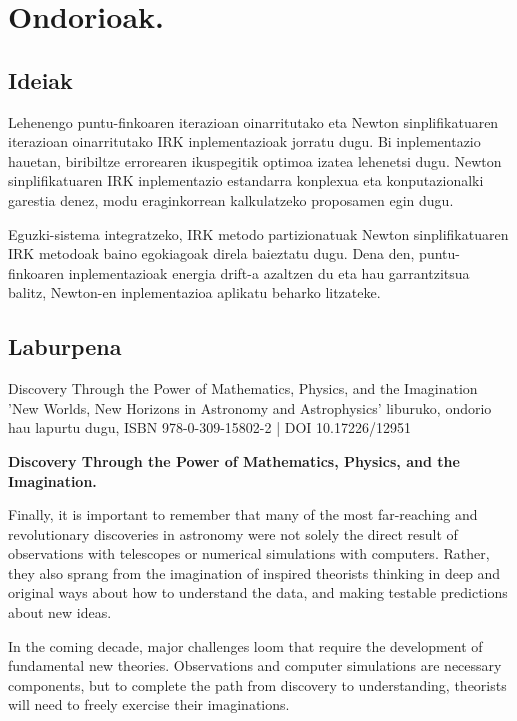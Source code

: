 \chapter{Ondorioak.}


\section*{Ideiak}


Lehenengo puntu-finkoaren iterazioan oinarritutako eta Newton sinplifikatuaren iterazioan oinarritutako IRK inplementazioak jorratu dugu. Bi inplementazio hauetan, biribiltze errorearen ikuspegitik optimoa izatea lehenetsi dugu. Newton sinplifikatuaren IRK inplementazio estandarra konplexua eta konputazionalki garestia denez, modu eraginkorrean kalkulatzeko proposamen egin dugu.

Eguzki-sistema integratzeko, IRK metodo partizionatuak Newton sinplifikatuaren IRK metodoak baino egokiagoak direla baieztatu dugu. Dena den, puntu-finkoaren inplementazioak energia drift-a azaltzen du eta hau garrantzitsua balitz, Newton-en inplementazioa aplikatu beharko litzateke.        

\section*{Laburpena}

Discovery Through the Power of Mathematics, Physics, and the Imagination
'New Worlds, New Horizons in Astronomy and Astrophysics' liburuko, ondorio hau lapurtu dugu,
ISBN 978-0-309-15802-2 | DOI 10.17226/12951

\begin{displayquote}
\textbf{Discovery Through the Power of Mathematics, Physics, and the Imagination.}

Finally, it is important to remember that many of the most far-reaching and revolutionary discoveries in astronomy were not solely the direct result of observations with telescopes or numerical simulations with computers. Rather, they also sprang from the imagination of inspired theorists thinking in deep and original ways about how to understand the data, and making testable predictions about new ideas.

In the coming decade, major challenges loom that require the development of fundamental new theories. Observations and computer simulations are necessary components, but to complete the path from discovery to understanding, theorists will need to freely exercise their imaginations.
\end{displayquote}



